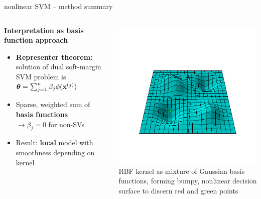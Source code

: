 \documentclass[11pt,compress,t,notes=noshow, xcolor=table]{beamer}
\newcommand{\highlight}[1]{\textcolor{hlcol}{\textbf{#1}}}
\begin{document}
\begin{frame2}{nonlinear SVM -- method summary}
\begin{columns}[T, totalwidth=\textwidth]
\begin{column}{0.59\textwidth}
\highlight{Interpretation as basis function approach}
  \begin{itemize}
    \item \textbf{Representer theorem:} solution of dual soft-margin SVM problem is
    $\thetav = \sum_{j=1}^n \beta_j \phi (\xi[j] )$ \\
    \item Sparse, weighted sum of \textbf{basis functions}\\
    $\rightarrow \beta_j = 0$ 
    for non-SVs
    \item Result: \textbf{local} model with smoothness depending on kernel
  \end{itemize}
    \end{column}
        \begin{column}{0.4\textwidth}
        \centering
  \includegraphics[width=\textwidth, trim=50 100 50 150, clip]{
  figure/svm_rbf_as_basis.png} \\
  \tiny{RBF kernel as mixture of Gaussian basis functions, forming
  bumpy, nonlinear decision surface to discern red and green points}
    \end{column}
\end{columns}

\end{frame2}
\end{document}

